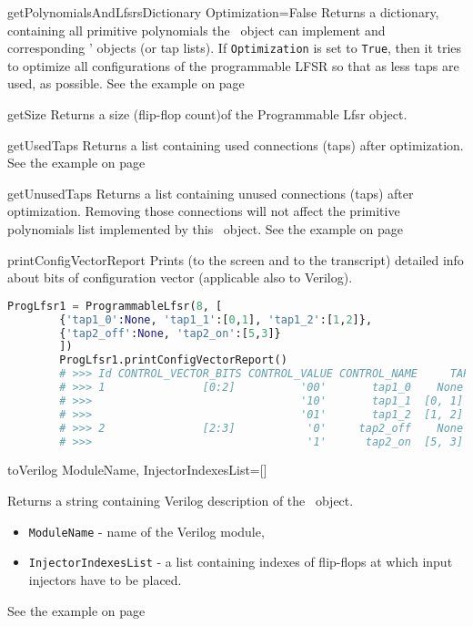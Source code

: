  {getPolynomialsAndLfsrsDictionary} {Optimization=False} {
	Returns a dictionary, containing all primitive polynomials the \ProgrammableLfsr\ object can implement and corresponding \Lfsr' objects (or tap lists). If \texttt{Optimization} is set to \texttt{True}, then it tries to optimize all configurations of the programmable LFSR so that as less taps are used, as possible.
	See the example on page \pageref{programmablelfsrexample}
}

 {getSize} {} {
	Returns a size (flip-flop count)of the Programmable Lfsr object.
}

 {getUsedTaps} {} {
	Returns a list containing used connections (taps) after optimization. 
	See the example on page \pageref{programmablelfsrexample}
}

 {getUnusedTaps} {} {
	Returns a list containing unused connections (taps) after optimization. Removing those connections will not affect the primitive polynomials list implemented by this \ProgrammableLfsr\ object.
	See the example on page \pageref{programmablelfsrexample}
}

 {printConfigVectorReport} {} {
	Prints (to the screen and to the transcript) detailed info about bits of configuration vector (applicable also to Verilog).
}
\begin{lstlisting}[language=Python]
		ProgLfsr1 = ProgrammableLfsr(8, [
		{'tap1_0':None, 'tap1_1':[0,1], 'tap1_2':[1,2]},
		{'tap2_off':None, 'tap2_on':[5,3]}
		])
		ProgLfsr1.printConfigVectorReport()
		# >>> Id CONTROL_VECTOR_BITS CONTROL_VALUE CONTROL_NAME     TAP
		# >>> 1               [0:2]          '00'       tap1_0    None
		# >>>                                '10'       tap1_1  [0, 1]
		# >>>                                '01'       tap1_2  [1, 2]
		# >>> 2               [2:3]           '0'     tap2_off    None
		# >>>                                 '1'      tap2_on  [5, 3]
\end{lstlisting}

 {toVerilog} {ModuleName, InjectorIndexesList=[]} {
	Returns a string containing Verilog description of the \ProgrammableLfsr\ object.
	\begin{itemize}
		\item \texttt{ModuleName} - name of the Verilog module,
		\item \texttt{InjectorIndexesList} - a list containing indexes of flip-flops at which input injectors have to be placed.
	\end{itemize}
	See the example on page \pageref{programmablelfsrexample}
}

